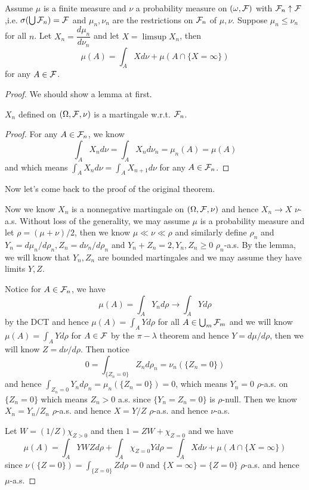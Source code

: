 \begin{theorem}
    Assume $\mu$ is a finite measure and $\nu$ a probability measure on $(\omega,\mathcal{F})$ with $\mathcal{F}_n \uparrow \mathcal{F}$,i.e. $\sigma(\bigcup \mathcal{F}_n) = \mathcal{F}$ and $\mu_n,\nu_n$ are the restrictions on $\mathcal{F}_n$ of $\mu,\nu$. Suppose $\mu_n \leq \nu_n$ for all $n$. Let $X_n = \dfrac{d\mu_n}{d\nu_n}$ and let $X = \limsup X_n$, then
    \[
    \mu(A) = \int_A Xd\nu + \mu(A\cap\{X=\infty\})
    \]
    for any $A\in\mathcal{F}$.
\end{theorem}
\begin{proof}\par
    We should show a lemma at first.
    \begin{lemma}
        $X_n$ defined on $(\Omega,\mathcal{F},\nu)$ is a martingale w.r.t. $\mathcal{F}_n$.
    \end{lemma}
    \begin{proof}\par
        For any $A\in \mathcal{F}_n$, we know
        \[
        \int_A X_n d\nu = \int_A X_n d\nu_n = \mu_n(A) = \mu(A)
        \]
        and which means $\int_A X_n d\nu= \int_A X_{n+1} d\nu$
        for any $A \in \mathcal{F}_n$.
    \end{proof}
    Now let's come back to the proof of the original theorem.\par
    Now we know $X_n$ is a nonnegative martingale on $(\Omega,\mathcal{F},\nu)$ and hence $X_n \to X$ $\nu$-a.s. Without loss of the generality, we may assume $\mu$ is a probability measure and let $\rho = (\mu+\nu)/2$, then we know $\mu\ll \nu \ll \rho$ and similarly define $\rho_n$ and $Y_n = d\mu_n/d\rho_n, Z_n = d\nu_n/d\rho_n$ and $Y_n+Z_n = 2, Y_n,Z_n \geq 0$ $\rho_n$-a.s. By the lemma, we will know that $Y_n,Z_n$ are bounded martingales and we may assume they have limits $Y,Z$.\par
    Notice for $A\in \mathcal{F}_n$, we have
    \[
    \mu(A) = \int_A Y_n d\rho \to \int_A Y d\rho 
    \]
    by the DCT and hence $\mu(A) = \int_A Y d\rho$ for all $A\in \bigcup_{m}\mathcal{F}_m$ and we will know $\mu(A) = \int_A Yd\rho$ for $A\in \mathcal{F}$ by the $\pi-\lambda$ theorem and hence $Y = d\mu/d\rho$, then we will know $Z = d\nu/d\rho$. Then notice
    \[
    0 = \int_{\{Z_n = 0\}} Z_n d\rho_n = \nu_n(\{Z_n = 0\})
    \]
    and hence $\int_{Z_n = 0}Y_n d\rho_n = \mu_n(\{Z_n = 0\}) = 0$, which means $Y_n = 0$ $\rho$-a.s. on $\{Z_n = 0\}$ which means $Z_n > 0$ a.s. since $\{Y_n = Z_n = 0\}$ is $\rho$-null. Then we know $X_n = Y_n/Z_n$ $\rho$-a.s. and hence $X = Y/Z$ $\rho$-a.s. and hence $\nu$-a.s.\par
    Let $W = (1/Z)\chi_{Z>0}$ and then $1 = ZW + \chi_{Z=0}$ and we have
    \[
    \mu(A) = \int_A YWZ d\rho + \int_A \chi_{Z = 0}Yd\rho = \int_A Xd\nu + \mu(A\cap\{X=\infty\})
    \]
    since $\nu(\{Z= 0\}) = \int_{\{Z=0\}} Zd\rho = 0$ and $\{X=\infty\} = \{Z=0\}$ $\rho$-a.s. and hence $\mu$-a.s.
\end{proof}

